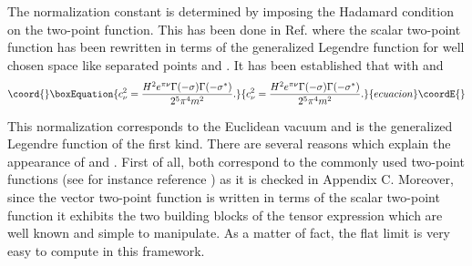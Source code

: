 \documentclass[a4paper,11pt,showpacs,preprintnumbers]{revtex4}
\def\z {{\cal Z}}
\begin{document}
The normalization constant \coordHE{} is determined by imposing
the Hadamard condition on the two-point function. This has been
done in Ref. \cite{brmo} where the scalar two-point function has
been rewritten in terms of the generalized Legendre function  for
well chosen space like separated points \coordHE{} and \coordHE{}. It has been
established that \myHighlight{$W_{0}(z,z') = C_\nu P_{\sigma}^{(5)}(-\z)$}\coordHE{} with
\coordHE{} and
\begin{equation}\coord{}\boxEquation{
c_\nu^{2}=\frac{H^2e^{\pi\nu}\Gamma(-\sigma)\Gamma(-\sigma^{*})}{2^5\pi^4
m^{2}}. \label{eq:nor}
}{
c_\nu^{2}=\frac{H^2e^{\pi\nu}\Gamma(-\sigma)\Gamma(-\sigma^{*})}{2^5\pi^4
m^{2}}. }{ecuacion}\coordE{}\end{equation}




This normalization corresponds to the Euclidean vacuum \cite{brmo}
and \myHighlight{$P_{\sigma}^{(5)}(\z)$}\coordHE{} is the generalized Legendre function of
the first kind. There are several reasons which explain the
appearance of \coordHE{} and \coordHE{}. First
of all, both correspond to the commonly used two-point functions
(see for instance reference \cite{allen}) as it is checked in
Appendix C. Moreover, since the vector two-point function is
written in terms of the scalar two-point function it exhibits the
two building blocks of the tensor expression which are well known
and simple to manipulate. As a matter of fact, the flat limit is
very easy to compute in this framework.
\end{document}
